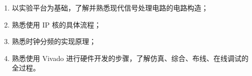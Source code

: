 \begin{enumerate}
    \item 以实验平台为基础，了解并熟悉现代信号处理电路的电路构造；
    \item 熟悉使用 IP 核的具体流程；
    \item 熟悉时钟分频的实现原理；
    \item 熟悉使用 Vivado 进行硬件开发的步骤，了解仿真、综合、布线、在线调试的全过程。
\end{enumerate}
